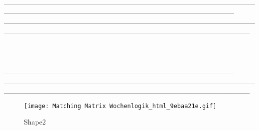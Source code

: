 \hypertarget{was-hat-uxfcberraschend-gut-geholfen}{%
\subsubsection[\textbf{\textcolor{ctmmBlue}{\1}}]{\texorpdfstring{\protect\hypertarget{was-hat-uxfcberraschend-gut-geholfen}{}{}\textbf{\textcolor{ctmmBlue}{\1}}}{Was hat überraschend gut geholfen?}}\label{was-hat-uxfcberraschend-gut-geholfen}}

🧠 \_\_\_\_\_\_\_\_\_\_\_\_\_\_\_\_\_\_\_\_\_\_\_\_\_\_\_\_\_\_\_\_\_\_\_\_\_\_\_\_\_\_\_\_\_\_\_\_\_\_\_\_\_\_\_\_\_\_\_\_\_\_\_\_\_\_\_\_\_\_\_\_\_\_\_\_\_\_\_\_\_\_\_\_\_\_\_\_\_\_\_\_ \_\_\_\_\_\_\_\_\_\_\_\_\_\_\_\_\_\_\_\_\_\_\_\_\_\_\_\_\_\_\_\_\_\_\_\_\_\_\_\_\_\_\_\_\_\_\_\_\_\_\_\_\_\_\_\_\_\_\_\_\_\_\_\_\_\_\_\_\_\_\_\_\_\_\_\_\_\_\_\_\_\_\_\_\_\_\_\_\_\_\_\_\_\_\_

\hypertarget{gab-es-stille-phasen-unerkannte-trigger}{%
\subsubsection[ \textbf{\textcolor{ctmmBlue}{\1}}]{\texorpdfstring{\protect\hypertarget{gab-es-stille-phasen-unerkannte-trigger}{}{} \textbf{\textcolor{ctmmBlue}{\1}}}{ Gab es stille Phasen, unerkannte Trigger?}}\label{gab-es-stille-phasen-unerkannte-trigger}}

🧠 \_\_\_\_\_\_\_\_\_\_\_\_\_\_\_\_\_\_\_\_\_\_\_\_\_\_\_\_\_\_\_\_\_\_\_\_\_\_\_\_\_\_\_\_\_\_\_\_\_\_\_\_\_\_\_\_\_\_\_\_\_\_\_\_\_\_\_\_\_\_\_\_\_\_\_\_\_\_\_\_\_\_\_\_\_\_\_\_\_\_\_\_ \_\_\_\_\_\_\_\_\_\_\_\_\_\_\_\_\_\_\_\_\_\_\_\_\_\_\_\_\_\_\_\_\_\_\_\_\_\_\_\_\_\_\_\_\_\_\_\_\_\_\_\_\_\_\_\_\_\_\_\_\_\_\_\_\_\_\_\_\_\_\_\_\_\_\_\_\_\_\_\_\_\_\_\_\_\_\_\_\_\_\_\_\_\_\_

\hfill\break
\hfill\break

\hfill\break
\hfill\break

\begin{figure}
\hypertarget{Shape2}{%
\centering
\texttt{[image: Matching Matrix Wochenlogik\_html\_9ebaa21e.gif]}
\caption{Shape2}\label{Shape2}
}
\end{figure}

\hypertarget{ctmm-navigation}{%
\subsection[🧭 \ul{\textbf{\textcolor{ctmmBlue}{\1}}}]{\texorpdfstring{\protect\hypertarget{ctmm-navigation}{}{}🧭 \ul{\textbf{\textcolor{ctmmBlue}{\1}}}}{🧭 CTMM-NAVIGATION}}\label{ctmm-navigation}}

